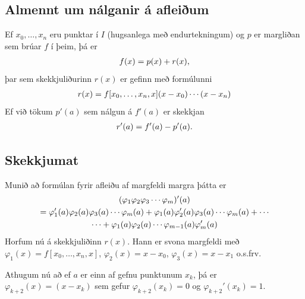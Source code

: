 \documentclass[letterpaper,10pt,icelandic]{sphinxmanual}
\begin{document}
\subsection{Almennt um nálganir á afleiðum}
\label{kafli04:almennt-um-nalganir-a-afleium}
Ef \(x_0,\ldots, x_n\) eru punktar í \(I\) (hugsanlega með
endurtekningum) og \(p\) er margliðan sem brúar \(f\) í þeim, þá
er
\begin{gather}
\begin{split}f(x) = p(x) + r(x),\end{split}\notag
\end{gather}
þar sem skekkjuliðurinn \(r(x)\) er gefinn með formúlunni
\begin{gather}
\begin{split}r(x)=f[x_0,\ldots,x_n,x](x-x_0)\cdots(x-x_n)\end{split}\notag
\end{gather}
Ef við tökum \(p'(a)\) sem nálgun á \(f'(a)\) er skekkjan
\begin{gather}
\begin{split}r'(a) =  f'(a) - p'(a).\end{split}\notag
\end{gather}

\subsection{Skekkjumat}
\label{kafli04:index-5}\label{kafli04:id1}
Munið að formúlan fyrir afleiðu af margfeldi margra þátta er
\begin{gather}
\begin{split}\begin{gathered}
  (\varphi_1\varphi_2\varphi_3\cdots\varphi_m)'(a)\\
=\varphi_1'(a)\varphi_2(a)\varphi_3(a)\cdots\varphi_m(a)
+\varphi_1(a)\varphi_2'(a)\varphi_3(a)\cdots\varphi_m(a)
+\cdots\\
\cdots+\varphi_1(a)\varphi_2(a)\cdots \varphi_{m-1}(a)\varphi_m'(a)\\\end{gathered}\end{split}\notag
\end{gather}
Horfum nú á skekkjuliðinn \(r(x)\). Hann er svona margfeldi með
\(\varphi_1(x)=f[x_0,\dots,x_n,x]\), \(\varphi_2(x)=x-x_0\),
\(\varphi_3(x)=x-x_1\) o.s.frv.

Athugum nú að ef \(a\) er einn af gefnu punktunum \(x_k\), þá er
\(\varphi_{k+2}(x)=(x-x_k)\) sem gefur \(\varphi_{k+2}(x_k)=0\)
og \(\varphi_{k+2}'(x_k)=1\).
\end{document}
